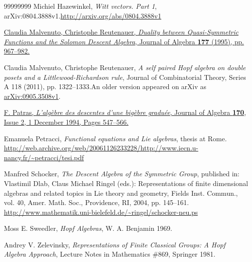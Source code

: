 \documentclass[numbers=enddot,12pt,final,onecolumn,notitlepage,abstracton]{scrartcl}%
\theoremstyle{definition}
\begin{document}
\begin{thebibliography}{99999999}
Michiel Hazewinkel, \textit{Witt vectors. Part 1},
arXiv:0804.3888v1.\newline\url{http://arxiv.org/abs/0804.3888v1}

%
\href{https://doi.org/10.1006/jabr.1995.1336}{Claudia
Malvenuto, Christophe Reutenauer, \textit{Duality between Quasi-Symmetric
Functions and the Solomon Descent Algebra}, Journal of Algebra \textbf{177}
(1995), pp. 967--982.}

Claudia Malvenuto, Christophe Reutenauer,
\textit{A self paired Hopf algebra on double posets and a
Littlewood-Richardson rule}, Journal of Combinatorial Theory, Series A 118
(2011), pp. 1322--1333.\newline An older version appeared on arXiv as
\href{http://arxiv.org/abs/0905.3508v1}{arXiv:0905.3508v1}.

\href{https://doi.org/10.1006/jabr.1994.1352}{F.
Patras, \textit{L'alg\`{e}bre des descentes d'une big\`{e}bre gradu\'{e}e},
Journal of Algebra \textbf{170}, Issue 2, 1 December 1994, Pages 547--566.}

Emanuela Petracci, \textit{Functional equations and
Lie algebras}, thesis at Rome.\newline%
\url{http://web.archive.org/web/20061126233228/http://www.iecn.u-nancy.fr/~petracci/tesi.pdf}

Manfred Schocker, \textit{The Descent Algebra of
the Symmetric Group}, published in: Vlastimil Dlab, Claus Michael Ringel
(eds.): Representations of finite dimensional algebras and related topics in
Lie theory and geometry, Fields Inst. Commun., vol. 40, Amer. Math. Soc.,
Providence, RI, 2004, pp. 145--161.\newline%
\url{http://www.mathematik.uni-bielefeld.de/~ringel/schocker-neu.ps}

Moss E. Sweedler, \textit{Hopf Algebras}, W. A.
Benjamin 1969.

Andrey V. Zelevinsky, \textit{Representations of
Finite Classical Groups: A Hopf Algebra Approach}, Lecture Notes in
Mathematics \#869, Springer 1981.
\end{thebibliography}
\end{document}
